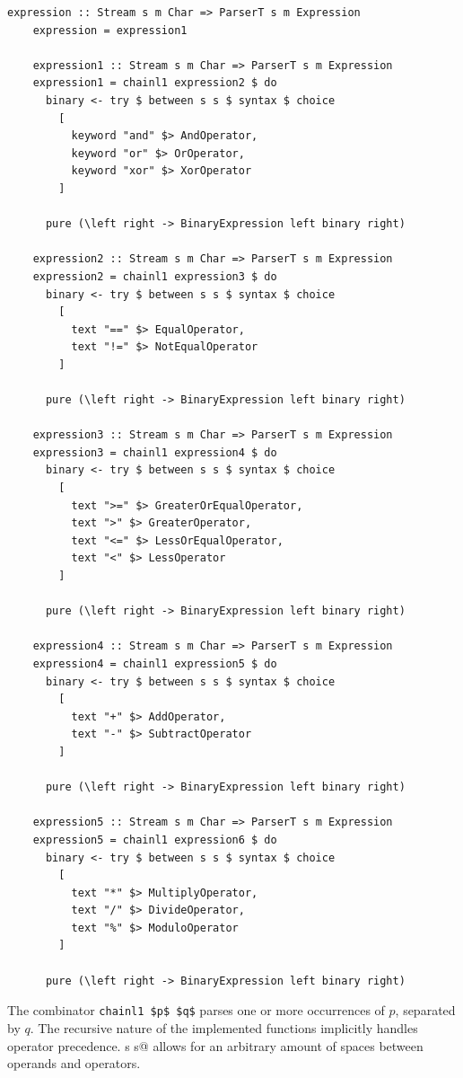 \documentclass[UdineBachThesis,american,11pt]{PhdThesis}
\begin{document}
  \begin{lstlisting}[gobble=4,basicstyle=\ttfamily\small]
    expression :: Stream s m Char => ParserT s m Expression
    expression = expression1

    expression1 :: Stream s m Char => ParserT s m Expression
    expression1 = chainl1 expression2 $ do
      binary <- try $ between s s $ syntax $ choice
        [
          keyword "and" $> AndOperator,
          keyword "or" $> OrOperator,
          keyword "xor" $> XorOperator
        ]

      pure (\left right -> BinaryExpression left binary right)

    expression2 :: Stream s m Char => ParserT s m Expression
    expression2 = chainl1 expression3 $ do
      binary <- try $ between s s $ syntax $ choice
        [
          text "==" $> EqualOperator,
          text "!=" $> NotEqualOperator
        ]

      pure (\left right -> BinaryExpression left binary right)

    expression3 :: Stream s m Char => ParserT s m Expression
    expression3 = chainl1 expression4 $ do
      binary <- try $ between s s $ syntax $ choice
        [
          text ">=" $> GreaterOrEqualOperator,
          text ">" $> GreaterOperator,
          text "<=" $> LessOrEqualOperator,
          text "<" $> LessOperator
        ]

      pure (\left right -> BinaryExpression left binary right)

    expression4 :: Stream s m Char => ParserT s m Expression
    expression4 = chainl1 expression5 $ do
      binary <- try $ between s s $ syntax $ choice
        [
          text "+" $> AddOperator,
          text "-" $> SubtractOperator
        ]

      pure (\left right -> BinaryExpression left binary right)

    expression5 :: Stream s m Char => ParserT s m Expression
    expression5 = chainl1 expression6 $ do
      binary <- try $ between s s $ syntax $ choice
        [
          text "*" $> MultiplyOperator,
          text "/" $> DivideOperator,
          text "%" $> ModuloOperator
        ]

      pure (\left right -> BinaryExpression left binary right)
  \end{lstlisting}

  The combinator \lstinline[mathescape]@chainl1 $p$ $q$@ parses one or more
  occurrences of $p$, separated by $q$. The recursive nature of the implemented
  functions implicitly handles operator precedence. \lstinline@between s s@
  allows for an arbitrary amount of spaces between operands and operators.
\end{document}
